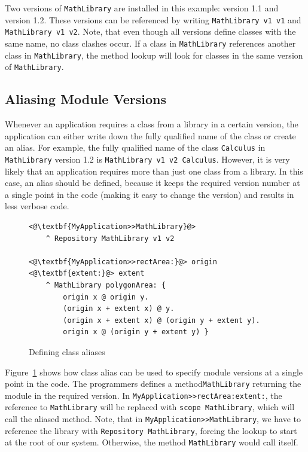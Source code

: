 Two versions of \texttt{MathLibrary} are installed in this example: version 1.1 and version 1.2. These versions can be referenced by writing \texttt{MathLibrary v1 v1} and \texttt{MathLibrary v1 v2}. Note, that even though all versions define classes with the same name, no class clashes occur. If a class in \texttt{MathLibrary} references another class in \texttt{MathLibrary}, the method lookup will look for classes in the same version of \texttt{MathLibrary}.

\subsection{Aliasing Module Versions}
Whenever an application requires a class from a library in a certain version, the application can either write down the fully qualified name of the class or create an alias. For example, the fully qualified name of the class \texttt{Calculus} in \texttt{MathLibrary} version 1.2 is \texttt{MathLibrary v1 v2 Calculus}. However, it is very likely that an application requires more than just one class from a library. In this case, an alias should be defined, because it keeps the required version number at a single point in the code (making it easy to change the version) and results in less verbose code.

\begin{figure}[!htp]
\begin{lstlisting}
<@\textbf{MyApplication>>MathLibrary}@>
    ^ Repository MathLibrary v1 v2

<@\textbf{MyApplication>>rectArea:}@> origin <@\textbf{extent:}@> extent
    ^ MathLibrary polygonArea: { 
        origin x @ origin y.
        (origin x + extent x) @ y.
        (origin x + extent x) @ (origin y + extent y).
        origin x @ (origin y + extent y) }
\end{lstlisting}
\caption{Defining class aliases}
\label{fig:use_alias}
\end{figure}

Figure~\ref{fig:use_alias} shows how class alias can be used to specify module versions at a single point in the code. The programmers defines a method\texttt{MathLibrary} returning the module in the required version. In \texttt{MyApplication>>rectArea:extent:}, the reference to \texttt{MathLibrary} will be replaced with \texttt{scope MathLibrary}, which will call the aliased method. Note, that in \texttt{MyApplication>>MathLibrary}, we have to reference the library with \texttt{Repository MathLibrary}, forcing the lookup to start at the root of our system. Otherwise, the method \texttt{MathLibrary} would call itself.

